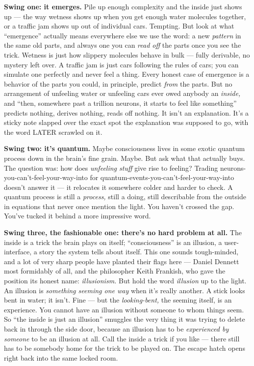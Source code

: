 \documentclass[11pt,openany]{book}
\begin{document}
\textbf{Swing one: it emerges.} Pile up enough complexity and the inside just shows up — the way wetness shows up when you get enough water molecules together, or a traffic jam shows up out of individual cars. Tempting. But look at what “emergence” actually means everywhere else we use the word: a new \textit{pattern} in the same old parts, and always one you can \textit{read off} the parts once you see the trick. Wetness is just how slippery molecules behave in bulk — fully derivable, no mystery left over. A traffic jam is just cars following the rules of cars; you can simulate one perfectly and never feel a thing. Every honest case of emergence is a behavior of the parts you could, in principle, predict \textit{from} the parts. But no arrangement of unfeeling water or unfeeling cars ever owed anybody an \textit{inside,} and “then, somewhere past a trillion neurons, it starts to feel like something” predicts nothing, derives nothing, reads off nothing. It isn’t an explanation. It’s a sticky note slapped over the exact spot the explanation was supposed to go, with the word LATER scrawled on it.

\textbf{Swing two: it’s quantum.} Maybe consciousness lives in some exotic quantum process down in the brain’s fine grain. Maybe. But ask what that actually buys. The question was: how does \textit{unfeeling stuff} give rise to feeling? Trading neurons-you-can’t-feel-your-way-into for quantum-events-you-can’t-feel-your-way-into doesn’t answer it — it relocates it somewhere colder and harder to check. A quantum process is still a \textit{process,} still a doing, still describable from the outside in equations that never once mention the light. You haven’t crossed the gap. You’ve tucked it behind a more impressive word.

\textbf{Swing three, the fashionable one: there’s no hard problem at all.} The inside is a trick the brain plays on itself; “consciousness” is an illusion, a user-interface, a story the system tells about itself. This one sounds tough-minded, and a lot of very sharp people have planted their flags here — Daniel Dennett most formidably of all, and the philosopher Keith Frankish, who gave the position its honest name: \textit{illusionism.} But hold the word \textit{illusion} up to the light. An illusion is \textit{something seeming one way} when it’s really another. A stick looks bent in water; it isn’t. Fine — but the \textit{looking-bent,} the seeming itself, is an experience. You cannot have an illusion without someone to whom things seem. So “the inside is just an illusion” smuggles the very thing it was trying to delete back in through the side door, because an illusion has to be \textit{experienced by someone} to be an illusion at all. Call the inside a trick if you like — there still has to be somebody home for the trick to be played on. The escape hatch opens right back into the same locked room.
\end{document}
